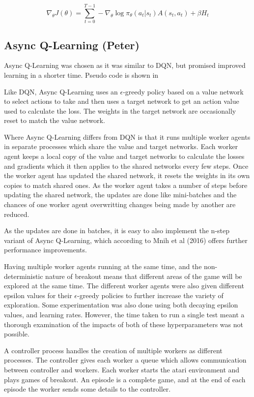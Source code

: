 \documentclass{article}
\begin{document}
\begin{equation}
\nabla_{\theta} J(\theta) = \sum_{t=0}^{T-1}-\nabla_{\theta}\log{\pi_{\theta}}(a_{t} | s_{t}) A(s_{t}, a_{t}) + \beta H_{t}
\end{equation}

\subsection{Async Q-Learning (Peter)}

Async Q-Learning was chosen as it was similar to DQN, but promised improved learning in a shorter time.
Pseudo code is shown in 

Like DQN, Async Q-Learning uses an $\epsilon$-greedy policy based on a value network to select actions to take and then uses a target network to get an action value used to calculate the loss.
The weights in the target network are occasionally reset to match the value network.

Where Async Q-Learning differs from DQN is that it runs multiple worker agents in separate processes which share the value and target networks.
Each worker agent keeps a local copy of the value and target networks to calculate the losses and gradients which it then applies to the shared networks every few steps.
Once the worker agent has updated the shared network, it resets the weights in its own copies to match shared ones.
As the worker agent takes a number of steps before updating the shared network, the updates are done like mini-batches and the chances of one worker agent overwritting changes being made by another are reduced.

As the updates are done in batches, it is easy to also implement the n-step variant of Async Q-Learning, which according to Mnih et al (2016) offers further performance improvements.

Having multiple worker agents running at the same time, and the non-deterministic nature of breakout means that different areas of the game will be explored at the same time.
The different worker agents were also given different epsilon values for their $\epsilon$-greedy policies to further increase the variety of exploration.
Some experimentation was also done using both decaying epsilon values, and learning rates. However, the time taken to run a single test meant a thorough examination of the impacts of both of these hyperparameters was not possible.

A controller process handles the creation of multiple workers as different processes.
The controller gives each worker a queue which allows communication between controller and workers.
Each worker starts the atari environment and plays games of breakout.
An episode is a complete game, and at the end of each episode the worker sends some details to the controller.
\end{document}
